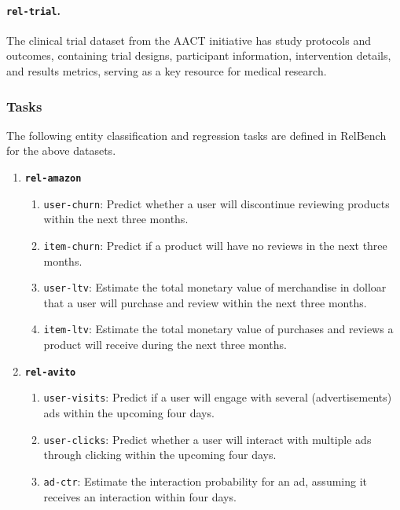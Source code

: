 \documentclass{article} %
\begin{document}
\paragraph{\texttt{rel-trial}.} The clinical trial dataset from the AACT initiative has study protocols and outcomes, containing trial designs, participant information, intervention details, and results metrics, serving as a key resource for medical research.

\subsubsection{Tasks}

The following entity classification and regression tasks are defined in RelBench for the above datasets.

\begin{enumerate}
\item \textbf{\texttt{rel-amazon}}
  \begin{enumerate}
    \item \texttt{\texttt{user-churn}}: Predict whether a user will discontinue reviewing products within the next three months.
    \item \texttt{\texttt{item-churn}}: Predict if a product will have no reviews in the next three months.
    \item \texttt{\texttt{user-ltv}}: Estimate the total monetary value of merchandise in dolloar that a user will purchase and review within the next three months.
    \item \texttt{\texttt{item-ltv}}: Estimate the total monetary value of purchases and reviews a product will receive during the next three months.
  \end{enumerate}

\item \textbf{\texttt{rel-avito}}
  \begin{enumerate}
    \item \texttt{\texttt{user-visits}}: Predict if a user will engage with several (advertisements) ads within the upcoming four days.
    \item \texttt{\texttt{user-clicks}}: Predict whether a user will interact with multiple ads through clicking within the upcoming four days.
    \item \texttt{\texttt{ad-ctr}}: Estimate the interaction probability for an ad, assuming it receives an interaction within four days.
  \end{enumerate}


\end{enumerate}
\end{document}
